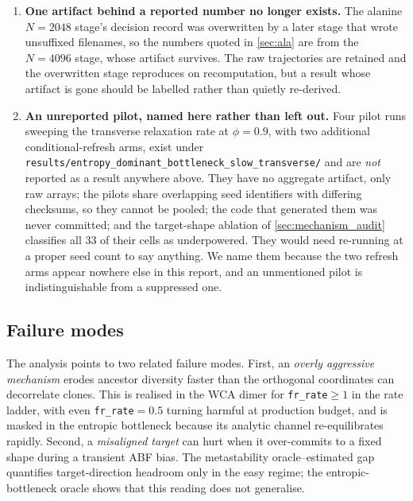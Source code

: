 \begin{enumerate}
        two-dimensional model with an analytic free energy, and the only \emph{many-body}
        establishment-limited evidence remains the WCA dimer, where no sham arm was run. The
        natural next step is to port the matched sham to the WCA cells, which requires no new
        physics and would test whether the attribution transfers.
  \item \textbf{One artifact behind a reported number no longer exists.} The alanine
        $N=2048$ stage's decision record was overwritten by a later stage that wrote
        unsuffixed filenames, so the numbers quoted in \cref{sec:ala} are from the $N=4096$
        stage, whose artifact survives. The raw trajectories are retained and the overwritten
        stage reproduces on recomputation, but a result whose artifact is gone should be
        labelled rather than quietly re-derived.
  \item \textbf{An unreported pilot, named here rather than left out.} Four pilot runs sweeping
        the transverse relaxation rate at $\phi = 0.9$, with two additional conditional-refresh
        arms, exist under
        \texttt{results/entropy\_dominant\_bottleneck\_slow\_transverse/} and are \emph{not}
        reported as a result anywhere above. They have no aggregate artifact, only raw arrays;
        the pilots share overlapping seed identifiers with differing checksums, so they cannot
        be pooled; the code that generated them was never committed; and the target-shape
        ablation of \cref{sec:mechanism_audit} classifies all $33$ of their cells as
        underpowered. They would need re-running at a proper seed count to say anything. We
        name them because the two refresh arms appear nowhere else in this report, and an
        unmentioned pilot is indistinguishable from a suppressed one.
\end{enumerate}

\subsection{Failure modes}
The analysis points to two related failure modes. First, an \emph{overly
aggressive mechanism} erodes ancestor diversity faster than the orthogonal
coordinates can decorrelate clones. This is realised in the WCA dimer for
\texttt{fr\_rate}$\ge1$ in the rate ladder, with even \texttt{fr\_rate}$=0.5$
turning harmful at production budget, and is masked in the entropic bottleneck
because its analytic channel re-equilibrates rapidly. Second, a \emph{misaligned
target} can hurt when it over-commits to a fixed shape during a transient ABF
bias. The metastability oracle--estimated gap quantifies target-direction
headroom only in the easy regime; the entropic-bottleneck oracle shows that this
reading does not generalise.

